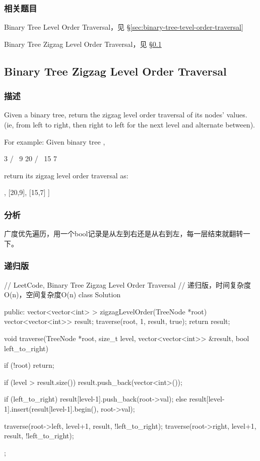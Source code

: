 \subsubsection{相关题目}
\begindot
\item Binary Tree Level Order Traversal，见 \S \ref{sec:binary-tree-tevel-order-traversal}
\item Binary Tree Zigzag Level Order Traversal，见 \S \ref{sec:binary-tree-zigzag-level-order-traversal}
\myenddot


\subsection{Binary Tree Zigzag Level Order Traversal}
\label{sec:binary-tree-zigzag-level-order-traversal}


\subsubsection{描述}
Given a binary tree, return the zigzag level order traversal of its nodes' values. (ie, from left to right, then right to left for the next level and alternate between).

For example:
Given binary tree ,
\begin{Code}
    3
   / \
  9  20
    /  \
   15   7
\end{Code}
return its zigzag level order traversal as:
\begin{Code}
[
  [3],
  [20,9],
  [15,7]
]
\end{Code}


\subsubsection{分析}
广度优先遍历，用一个bool记录是从左到右还是从右到左，每一层结束就翻转一下。


\subsubsection{递归版}
\begin{Code}
// LeetCode, Binary Tree Zigzag Level Order Traversal
// 递归版，时间复杂度O(n)，空间复杂度O(n)
class Solution {
public:
    vector<vector<int> > zigzagLevelOrder(TreeNode *root) {
        vector<vector<int>> result;
        traverse(root, 1, result, true);
        return result;
    }

    void traverse(TreeNode *root, size_t level, vector<vector<int>> &result,
            bool left_to_right) {
        if (!root) return;

        if (level > result.size())
            result.push_back(vector<int>());

        if (left_to_right)
            result[level-1].push_back(root->val);
        else
            result[level-1].insert(result[level-1].begin(), root->val);

        traverse(root->left, level+1, result, !left_to_right);
        traverse(root->right, level+1, result, !left_to_right);
    }
};
\end{Code}

